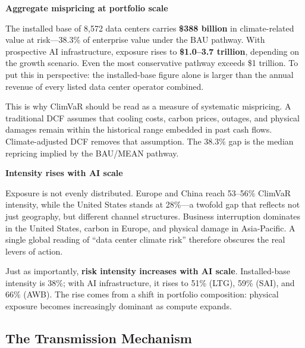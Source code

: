 \begin{twocolbody}

{\color{SEGreen}\textbf{Aggregate mispricing at portfolio scale}}

\vspace{1mm}

\noindent The installed base of 8{,}572 data centers carries \textbf{\$388 billion} in climate-related value at risk---38.3\% of enterprise value under the BAU pathway. With prospective AI infrastructure, exposure rises to \textbf{\$1.0--3.7 trillion}, depending on the growth scenario. Even the most conservative pathway exceeds \$1 trillion. To put this in perspective: the installed-base figure alone is larger than the annual revenue of every listed data center operator combined.

This is why ClimVaR should be read as a measure of systematic mispricing. A traditional DCF assumes that cooling costs, carbon prices, outages, and physical damages remain within the historical range embedded in past cash flows. Climate-adjusted DCF removes that assumption. The 38.3\% gap is the median repricing implied by the BAU/MEAN pathway.

\vspace{2mm}

{\color{SEGreen}\textbf{Intensity rises with AI scale}}

\vspace{1mm}

\noindent Exposure is not evenly distributed. Europe and China reach 53--56\% ClimVaR intensity, while the United States stands at 28\%---a twofold gap that reflects not just geography, but different channel structures. Business interruption dominates in the United States, carbon in Europe, and physical damage in Asia-Pacific. A single global reading of ``data center climate risk'' therefore obscures the real levers of action.

Just as importantly, \textbf{risk intensity increases with AI scale}. Installed-base intensity is 38\%; with AI infrastructure, it rises to 51\% (LTG), 59\% (SAI), and 66\% (AWB). The rise comes from a shift in portfolio composition: physical exposure becomes increasingly dominant as compute expands.

\end{twocolbody}

\vspace{2mm}

\subsection*{The Transmission Mechanism}\label{toc:transmission}
\greensep

